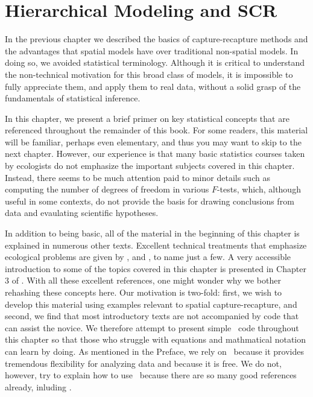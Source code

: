 \chapter{
Hierarchical Modeling and SCR
}
\label{chapt.modeling}


\vspace{.3in}

In the previous chapter we described the basics of capture-recapture
methods and the advantages that spatial models have over
traditional non-spatial models. In doing so, we avoided statistical
terminology. Although it is critical to
understand the non-technical motivation for this broad class of
models, it is impossible to fully appreciate them, and apply them to
real data, without a solid grasp of the fundamentals of statistical
inference.

In this chapter, we present a brief primer on key
statistical concepts that are referenced throughout the remainder of
this book. For some readers, this material will be familiar,
perhaps even elementary, and thus you may want to skip to the next
chapter. However, our experience is that many basic statistics courses
taken by ecologists do not emphasize the important subjects covered in
this chapter. Instead, there seems to be much attention paid to
minor details such as computing the number of degrees of freedom in
various $F$-tests, which, although useful in some contexts, do not
provide the basis for drawing conclusions from data and evaulating
scientific hypotheses. %

In addition to being basic, all of the material in the
beginning of this chapter is explained in numerous other
texts. %
Excellent technical treatments that emphasize ecological
problems are given by
\citet{williams_etal:2002}, \citet{royle_dorazio:2008} and
\citet{link_barker:2010}, to name just a few. A very accessible introduction to some of the
topics covered in this chapter is presented in Chapter 3 of
\citet{mackenzie_etal:2006}. With all these excellent references, one
might wonder why we bother rehashing these concepts here. Our motivation is
two-fold: first, we wish to develop this material using examples
relevant to spatial capture-recapture, and second, we find that most
introductory texts are not accompanied by code that can
assist the novice. We therefore attempt to present simple \R~code
throughout this chapter so that those who struggle with equations and
mathmatical notation can learn by doing. As mentioned in the Preface,
we rely on \R~because it provides tremendous flexibility for analyzing
data and because it is free. We do not, however, try to explain how to
use \R~because there are so many good references already, inluding
\citet{venables_ripley:2002,bolker:2008,venables_etal:2012}.

